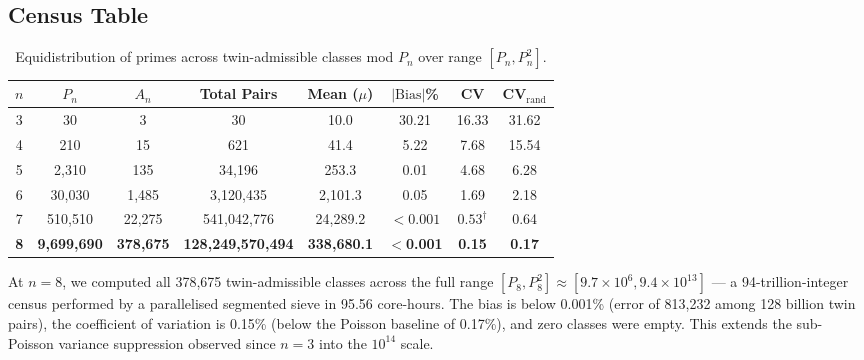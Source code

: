 \documentclass[11pt]{article}
\begin{document}
\subsection{Census Table}

\begin{table}[h]
\centering
\caption{Equidistribution of primes across twin-admissible classes mod $P_n$ over range $[P_n, P_n^2]$.}
\label{tab:numerical}
\begin{tabular}{cccccccc}
\toprule
$n$ & $P_n$ & $A_n$ & Total Pairs & Mean ($\mu$) & $|\text{Bias}|$\% & CV & CV$_{\text{rand}}$ \\
\midrule
3 & 30 & 3 & 30 & 10.0 & 30.21 & 16.33 & 31.62 \\
4 & 210 & 15 & 621 & 41.4 & 5.22 & 7.68 & 15.54 \\
5 & 2{,}310 & 135 & 34{,}196 & 253.3 & 0.01 & 4.68 & 6.28 \\
6 & 30{,}030 & 1{,}485 & 3{,}120{,}435 & 2{,}101.3 & 0.05 & 1.69 & 2.18 \\
7 & 510{,}510 & 22{,}275 & 541{,}042{,}776 & 24{,}289.2 & $<0.001$ & $0.53^{\dagger}$ & 0.64 \\
\textbf{8} & \textbf{9{,}699{,}690} & \textbf{378{,}675} & \textbf{128{,}249{,}570{,}494} & \textbf{338{,}680.1} & \textbf{$<$0.001} & \textbf{0.15} & \textbf{0.17} \\
\bottomrule
\end{tabular}

\vspace{0.5em}
\end{table}

\noindent At $n=8$, we computed all 378{,}675 twin-admissible classes across the full range $[P_8, P_8^2] \approx [9.7 \times 10^6, 9.4 \times 10^{13}]$ --- a 94-trillion-integer census performed by a parallelised segmented sieve in 95.56 core-hours. The bias is below 0.001\% (error of 813{,}232 among 128 billion twin pairs), the coefficient of variation is 0.15\% (below the Poisson baseline of 0.17\%), and zero classes were empty. This extends the sub-Poisson variance suppression observed since $n=3$ into the $10^{14}$ scale.
\end{document}
